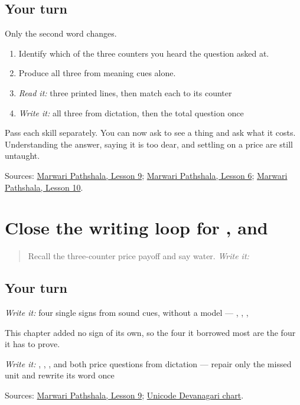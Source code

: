 \subsection*{Your turn}
Only the second word changes.

\begin{enumerate}
\raggedright
  \item Identify which of the three counters you heard the question asked at.
  \item Produce all three from meaning cues alone.
  \item \emph{Read it:} three printed lines, then match each to its counter
  \item \emph{Write it:} all three from dictation, then the total question once
\end{enumerate}

Pass each skill separately. You can now ask to see a thing and ask what it costs. Understanding the answer, saying it is too dear, and settling on a price are still untaught.

\begin{tcolorbox}[breakable,colback=teal!4,colframe=teal!35!black,title={Before you move on}]
Sources: \href{https://www.marwaripathshala.com/marwari-lesson-9-english}{Marwari Pathshala, Lesson 9}; \href{https://www.marwaripathshala.com/marwari-lesson-6-english}{Marwari Pathshala, Lesson 6}; \href{https://www.marwaripathshala.com/marwari-lesson-10-english}{Marwari Pathshala, Lesson 10}.
\end{tcolorbox}
\section[Practice]{Close the writing loop for ,  and }

\label{lesson:MW-R22-script-close}



\begin{quote}
Recall the three-counter price payoff and say water. \emph{Write it:} \textbf{}
\end{quote}

\subsection*{Your turn}
\emph{Write it:} four single signs from sound cues, without a model — \textbf{}, \textbf{}, \textbf{}, \textbf{}

This chapter added no sign of its own, so the four it borrowed most are the four it has to prove.

\emph{Write it:} \textbf{}, \textbf{}, \textbf{ }, and both price questions from dictation — repair only the missed unit and rewrite its word once

\begin{tcolorbox}[breakable,colback=teal!4,colframe=teal!35!black,title={Before you move on}]
Sources: \href{https://www.marwaripathshala.com/marwari-lesson-9-english}{Marwari Pathshala, Lesson 9}; \href{https://www.unicode.org/charts/PDF/U0900.pdf}{Unicode Devanagari chart}.
\end{tcolorbox}
